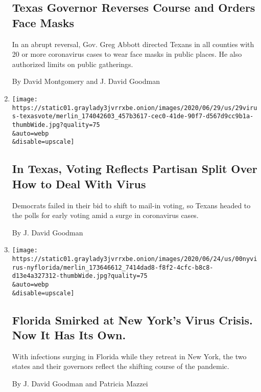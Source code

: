 \begin{enumerate}
{  \subsection{Texas Governor Reverses Course and Orders Face
  Masks}\label{texas-governor-reverses-course-and-orders-face-masks}}

  In an abrupt reversal, Gov. Greg Abbott directed Texans in all
  counties with 20 or more coronavirus cases to wear face masks in
  public places. He also authorized limits on public gatherings.

  By David Montgomery and J. David Goodman
\item
  \href{/2020/06/29/us/texas-early-voting-coronavirus.html}{}

  \texttt{[image: https://static01.graylady3jvrrxbe.onion/images/2020/06/29/us/29virus-texasvote/merlin\_174042603\_457b3617-cec0-41de-90f7-d567d9cc9b1a-thumbWide.jpg?quality=75\\\&auto=webp\\\&disable=upscale]}

  \hypertarget{in-texas-voting-reflects-partisan-split-over-how-to-deal-with-virus}{%
  \subsection{In Texas, Voting Reflects Partisan Split Over How to Deal
  With
  Virus}\label{in-texas-voting-reflects-partisan-split-over-how-to-deal-with-virus}}

  Democrats failed in their bid to shift to mail-in voting, so Texans
  headed to the polls for early voting amid a surge in coronavirus
  cases.

  By J. David Goodman
\item
  \href{/2020/06/26/nyregion/florida-coronavirus-ny.html}{}

  \texttt{[image: https://static01.graylady3jvrrxbe.onion/images/2020/06/24/us/00nyvirus-nyflorida/merlin\_173646612\_7414dad8-f8f2-4cfc-b8c8-d13e4a327312-thumbWide.jpg?quality=75\\\&auto=webp\\\&disable=upscale]}

  \hypertarget{florida-smirked-at-new-yorks-virus-crisis-now-it-has-its-own}{%
  \subsection{Florida Smirked at New York's Virus Crisis. Now It Has Its
  Own.}\label{florida-smirked-at-new-yorks-virus-crisis-now-it-has-its-own}}

  With infections surging in Florida while they retreat in New York, the
  two states and their governors reflect the shifting course of the
  pandemic.

  By J. David Goodman and Patricia Mazzei
\end{enumerate}

